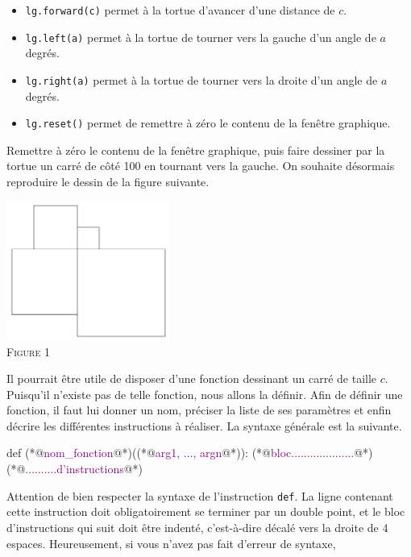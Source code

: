 \documentclass{magnolia}
\begin{document}
\begin{itemize}
\item \verb!lg.forward(c)! permet à la tortue d'avancer d'une distance de $c$.
\item \verb!lg.left(a)! permet à la tortue de tourner vers la gauche d'un angle de $a$ degrés.
\item \verb!lg.right(a)! permet à la tortue de tourner vers la droite d'un angle de $a$ degrés.
\item \verb!lg.reset()! permet de remettre à zéro le contenu de la fenêtre graphique.
\end{itemize}

\begin{questions}
\question Remettre à zéro le contenu de la fenêtre graphique, puis faire dessiner par la tortue un carré de côté 100 en tournant vers la gauche.
\enonce On souhaite désormais reproduire le dessin de la figure suivante.
\begin{center}
  \includegraphics[width=0.4\textwidth]{../../Commun/Images/python-tp-logo-1}\\
  \textsc{Figure 1}
  \end{center}
Il pourrait être utile de disposer d'une fonction dessinant un carré de taille $c$. Puisqu'il n'existe pas de
telle fonction, nous allons la définir. Afin de définir une fonction, il faut lui donner un nom, préciser la
liste de ses paramètres et enfin décrire les différentes instructions à réaliser. La syntaxe générale est
la suivante.
\begin{pythoncode}
def (*@\textcolor{purple}{nom\_fonction}@*)((*@\textcolor{purple}{arg1, ..., argn}@*)):
    (*@\textcolor{purple}{bloc....................}@*)
    (*@\textcolor{purple}{..........d'instructions}@*)
\end{pythoncode}
Attention de bien respecter la syntaxe de l'instruction \verb!def!. La ligne contenant cette instruction
doit obligatoirement se terminer par un double point, et le bloc d'instructions qui suit doit être indenté,
c'est-à-dire décalé vers la droite de 4 espaces. Heureusement, si vous n'avez pas fait d'erreur de syntaxe,

\end{questions}
\end{document}
